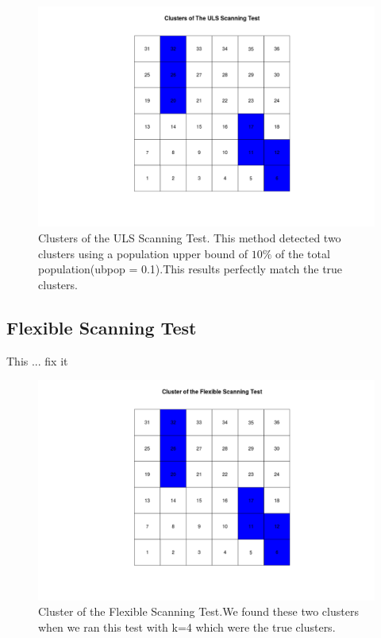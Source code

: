 \documentclass[12pt]{article}
\begin{document}
		\begin{figure}[!ht]
			
			\centering
			\includegraphics[scale=0.2]{Ex1_ULS}
			\caption{Clusters of the ULS Scanning Test. This method detected two clusters using a population upper bound of $10\%$ of the total population(ubpop = 0.1).This results perfectly match the true clusters. \label{f:gull}}
			
		\end{figure}	
	

		 
	 
\subsection{Flexible Scanning Test}	

This ... fix it
\begin{figure}[!ht]
	\centering
	\includegraphics[scale=0.2]{Ex1_Flexible}
	\caption{Cluster of the Flexible Scanning Test.We found these two clusters when we ran this test with k=4 which were the true clusters.\label{f:gull}}
\end{figure}
	
\end{document}

